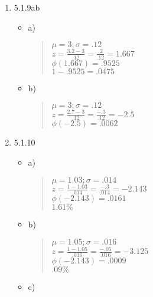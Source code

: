 \documentclass{article}
\begin{document}
\begin{enumerate}
    \item 5.1.9ab 
        \begin{itemize}
            \item a)
            \begin{quote}
                $\mu = 3; \sigma = .12$ \\
                $z = \frac{3.2-3}{.12} = \frac{.2}{.12} = 1.667$ \\
                $\phi(1.667) = .9525$ \\
                $1-.9525 = .0475$
            \end{quote}
        \end{itemize}
        \begin{itemize}
            \item b)
            \begin{quote}
                $\mu = 3; \sigma = .12$ \\
                $z = \frac{2.7-3}{.12} = \frac{-.3}{.12} = -2.5$ \\
                $\phi(-2.5) = .0062$
            \end{quote}
        \end{itemize}
    \item 5.1.10
        \begin{itemize}
            \item a)
            \begin{quote}
                $\mu = 1.03; \sigma = .014$ \\
                $z = \frac{1-1.03}{.014} = \frac{-.3}{.014} = -2.143$ \\
                $\phi(-2.143) = .0161$ \\
                $1.61\%$
            \end{quote}
        \end{itemize}
        \begin{itemize}
            \item b)
            \begin{quote}
                $\mu = 1.05; \sigma = .016$ \\
                $z = \frac{1-1.05}{.016} = \frac{-.05}{.016} = -3.125$ \\
                $\phi(-2.143) = .0009$ \\
                $.09\%$
            \end{quote}
        \end{itemize}
        \begin{itemize}
            \item c)

\end{itemize}
\end{enumerate}
\end{document}
